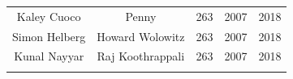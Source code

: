 \documentclass[]{book}
\theoremstyle{definition}
\theoremstyle{definition}
\theoremstyle{definition}
\theoremstyle{remark}
\begin{document}
\begin{longtable}[]{@{}ccccc@{}}
\begin{minipage}[t]{0.22\columnwidth}\centering\strut
Kaley Cuoco\strut
\end{minipage} & \begin{minipage}[t]{0.28\columnwidth}\centering\strut
Penny\strut
\end{minipage} & \begin{minipage}[t]{0.12\columnwidth}\centering\strut
263\strut
\end{minipage} & \begin{minipage}[t]{0.14\columnwidth}\centering\strut
2007\strut
\end{minipage} & \begin{minipage}[t]{0.11\columnwidth}\centering\strut
2018\strut
\end{minipage}\tabularnewline
\begin{minipage}[t]{0.22\columnwidth}\centering\strut
Simon Helberg\strut
\end{minipage} & \begin{minipage}[t]{0.28\columnwidth}\centering\strut
Howard Wolowitz\strut
\end{minipage} & \begin{minipage}[t]{0.12\columnwidth}\centering\strut
263\strut
\end{minipage} & \begin{minipage}[t]{0.14\columnwidth}\centering\strut
2007\strut
\end{minipage} & \begin{minipage}[t]{0.11\columnwidth}\centering\strut
2018\strut
\end{minipage}\tabularnewline
\begin{minipage}[t]{0.22\columnwidth}\centering\strut
Kunal Nayyar\strut
\end{minipage} & \begin{minipage}[t]{0.28\columnwidth}\centering\strut
Raj Koothrappali\strut
\end{minipage} & \begin{minipage}[t]{0.12\columnwidth}\centering\strut
263\strut
\end{minipage} & \begin{minipage}[t]{0.14\columnwidth}\centering\strut
2007\strut
\end{minipage} & \begin{minipage}[t]{0.11\columnwidth}\centering\strut
2018\strut
\end{minipage}\tabularnewline
\begin{minipage}[t]{0.22\columnwidth}\centering\strut

\end{minipage}
\end{longtable}
\end{document}

